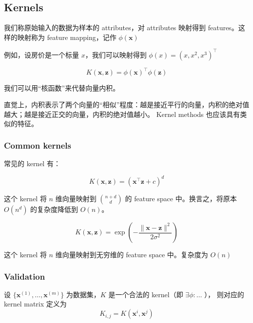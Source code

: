 \subsection{Kernels}
	\begin{df}
		我们称原始输入的数据为样本的 attributes，对 attributes 映射得到 features。这样的映射称为 feature mapping，记作 $ \phi(\bm{x}) $
	\end{df}
	例如，设房价是一个标量 $ x $，我们可以映射得到 $ \phi(x) = {\left( x, x^2, x^3  \right)} ^\intercal $
	
	\begin{df}
		\begin{equation*}
			K(\bm{x}, \bm{z}) = \phi(\bm{x})^\intercal \phi(\bm{z})
		\end{equation*}
	\end{df}
	我们可以用“核函数”来代替向量内积。
	
	直觉上，内积表示了两个向量的“相似”程度：越是接近平行的向量，内积的绝对值越大；越是接近正交的向量，内积的绝对值越小。
	Kernel methods 也应该具有类似的特征。
	
	\subsubsection{Common kernels}
		常见的 kernel 有：
		
		\begin{df}
			\begin{equation}
				K(\bm{x}, \bm{z}) = ( \bm{x}^\intercal \bm{z} + c )^d
			\end{equation}
		\end{df}
		这个 kernel 将 $ n $ 维向量映射到 $ \binom{n+d}{d} $ 的 feature space 中。换言之，将原本 $ O(n^d) $ 的复杂度降低到 $ O(n) $。
		
		\begin{df}
			\begin{equation}
				K(\bm{x}, \bm{z}) = \exp\left( - \frac{ \| \bm{x} - \bm{z} \|^2 }{2 \sigma^2} \right)
			\end{equation}
		\end{df}
		这个 kernel 将 $ n $ 维向量映射到无穷维的 feature space 中。复杂度为 $ O(n) $
		
	\subsubsection{Validation}
		\begin{df}
			设 $ \{ \bm{x}^{(1)}, \ldots, \bm{x}^{(m)} \} $ 为数据集，$ K $ 是一个合法的 kernel（即 $ \exists \phi: \ldots $ ），
			则对应的 kernel matrix 定义为
			\begin{equation*}
				K_{i,j} = K(\bm{x}^i, \bm{x}^j)
			\end{equation*}
		\end{df}
		
